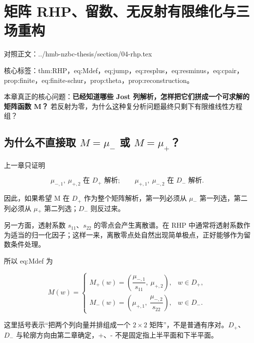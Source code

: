 
\chapter{矩阵 RHP、留数、无反射有限维化与三场重构}

对照正文：../hmb-nzbc-thesis/section/04-rhp.tex  \par
{\sloppy\raggedright 核心标签：thm:RHP，eq:Mdef，eq:jump，eq:resplus，eq:resminus，eq:cpair，prop:finite，eq:finite-schur，prop:theta，prop:reconstruction。\par}

本章真正的核心问题：\textbf{已经知道哪些 Jost 列解析，怎样把它们拼成一个可求解的矩阵函数 M？} 若反射为零，为什么这种复分析问题最终只剩下有限维线性方程组？\par

\section{为什么不直接取 \texorpdfstring{$M=\mu_-$}{M=mu-} 或 \texorpdfstring{$M=\mu_+$}{M=mu+}？}

上一章只证明\par

\[
\mu_{-,1},\ \mu_{+,2}\text{ 在 }D_+\text{ 解析};\qquad
\mu_{+,1},\ \mu_{-,2}\text{ 在 }D_-\text{ 解析}.
\]

因此，如果希望 M 在 $D_{+}$ 作为整个矩阵解析，第一列必须从 $\mu{}_{-}$ 第一列选，第二列必须从 $\mu{}_{+}$ 第二列选；$D_{-}$ 则反过来。\par

另一方面，透射系数 $s_{11}$、$s_{22}$ 的零点会产生离散谱。在 RHP 中通常将透射系数作为适当的归一化因子；这样一来，离散零点处自然出现简单极点，正好能够作为留数条件处理。\par

所以 eq:Mdef 为\par

\[
M(w)=
\begin{cases}
M_+(w)=\left(\dfrac{\mu_{-,1}}{s_{11}},\ \mu_{+,2}\right),
&w\in D_+,\\[6pt]
M_-(w)=\left(\mu_{+,1},\ \dfrac{\mu_{-,2}}{s_{22}}\right),
&w\in D_-.
\end{cases}
\]

这里括号表示“把两个列向量并排组成一个 $2\times{}2$ 矩阵”，不是普通有序对。$D_{+}$、$D_{-}$ 与轮廓方向由第二章确定，+、- 不是固定指上半平面和下半平面。\par

